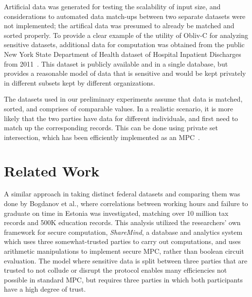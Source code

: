\documentclass[conference]{IEEEtran}
\begin{document}
Artificial data was generated for testing the scalability of input size,
and considerations to automated data match-ups between two separate
datasets were not implemented; the artifical data was presumed to
already be matched and sorted properly.  To provide a clear example of
the utility of Obliv-C for analyzing sensitive datasets, additional data
for computation was obtained from the public New York State Department
of Health dataset of Hospital Inpatient Discharges from
2011~\cite{healthdata:ny}.  This dataset is publicly available and in a
single database, but provides a reasonable model of data that is
sensitive and would be kept privately in different subsets kept by
different organizations.


The datasets used in our preliminary experiments assume that data is
matched, sorted, and comprises of comparable values. In a realistic
scenario, it is more likely that the two parties have data for different
individuals, and first need to match up the corresponding records.  This
can be done using private set intersection, which has been efficiently
implemented as an MPC~\cite{yan2012}.

\section{Related Work}

A similar approach in taking distinct federal datasets and comparing
them was done by Bogdanov et al., where correlations between working
hours and failure to graduate on time in Estonia was investigated,
matching over 10 million tax records and 500K education
records\cite{cryptoeprint:2015:1159}.  This analysis utilized the
researchers' own framework for secure computation, \emph{ShareMind}, a
database and analytics system which uses three somewhat-trusted parties
to carry out computations, and uses arithmetic manipulations to
implement secure MPC, rather than boolean circuit
evaluation\cite{sharemind}.  The model where sensitive data is split
between three parties that are trusted to not collude or disrupt the
protocol enables many efficiencies not possible in standard MPC, but
requires three parties in which both participants have a high degree of
trust.
\end{document}
